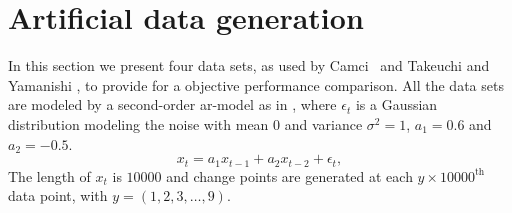 \section{Artificial data generation}\label{sec:artificial_data_generation}
In this section we present four data sets, as used by Camci~\cite{camci2010change} and Takeuchi and Yamanishi \cite{takeuchi2006unifying}, to provide for a objective performance comparison.
All the data sets are modeled by a second-order \gls{ar}-model as in , where $\epsilon_t$ is a Gaussian distribution modeling the noise with mean $0$ and variance $\sigma^2 = 1$, $a_1 = 0.6$ and $a_2 = -0.5$.
\begin{equation}\label{eq:artificial_data_sets_model}
  x_t = a_1 x_{t-1} + a_2 x_{t-2} + \epsilon_t,
\end{equation}
The length of $x_t$ is $10000$ and change points are generated at each $y \times 10000^\text{th}$ data point, with $y = (1, 2, 3, \dots, 9)$.


